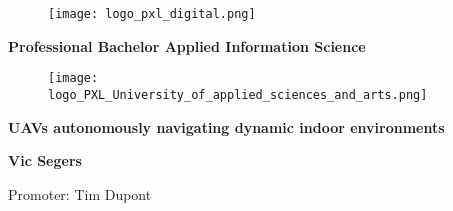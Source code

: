 \begin{titlepage}
  \thispagestyle{titlepage}
  \color{pxlgreen}
  \begin{figure}
    \centering
    \texttt{[image: logo\_pxl\_digital.png]}
  \end{figure}
  \vspace{\baselineskip}
  \begin{center}
    \LARGE\textbf{Professional Bachelor Applied Information Science}
  \end{center}
  \vspace{\baselineskip}
  \begin{figure}[h]
    \centering
    \texttt{[image: logo\_PXL\_University\_of\_applied\_sciences\_and\_arts.png]}
  \end{figure}
  \begin{center}
    \Huge\textbf{UAVs autonomously navigating dynamic indoor environments}
  \end{center}
  \vspace{\baselineskip}
  \begin{center}
    \Large\textbf{Vic Segers}
  \end{center}
  \vspace{\baselineskip}
  \begin{center}
    \large{Promoter: Tim Dupont}
  \end{center}
\end{titlepage}